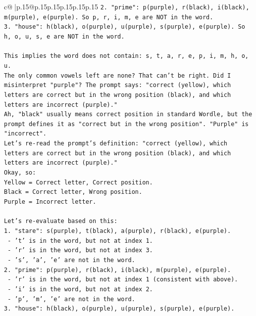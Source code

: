 \documentclass{article}
\begin{document}
{\begin{supertabular}{c@{$\;$}|p{.15\linewidth}@{}p{.15\linewidth}p{.15\linewidth}p{.15\linewidth}p{.15\linewidth}p{.15\linewidth}}
{{{\texttt{2. "prime": p(purple), r(black), i(black), m(purple), e(purple). So p, r, i, m, e are NOT in the word.} \\
\texttt{3. "house": h(black), o(purple), u(purple), s(purple), e(purple). So h, o, u, s, e are NOT in the word.} \\
\\ 
\texttt{This implies the word does not contain: s, t, a, r, e, p, i, m, h, o, u.} \\
\texttt{The only common vowels left are none? That can't be right. Did I misinterpret "purple"? The prompt says: "correct (yellow), which letters are correct but in the wrong position (black), and which letters are incorrect (purple)."} \\
\texttt{Ah, "black" usually means correct position in standard Wordle, but the prompt defines it as "correct but in the wrong position". "Purple" is "incorrect".} \\
\texttt{Let's re{-}read the prompt's definition: "correct (yellow), which letters are correct but in the wrong position (black), and which letters are incorrect (purple)."} \\
\texttt{Okay, so:} \\
\texttt{Yellow = Correct letter, Correct position.} \\
\texttt{Black = Correct letter, Wrong position.} \\
\texttt{Purple = Incorrect letter.} \\
\\ 
\texttt{Let's re{-}evaluate based on this:} \\
\texttt{1. "stare": s(purple), t(black), a(purple), r(black), e(purple).} \\
\texttt{   {-} 't' is in the word, but not at index 1.} \\
\texttt{   {-} 'r' is in the word, but not at index 3.} \\
\texttt{   {-} 's', 'a', 'e' are not in the word.} \\
\texttt{2. "prime": p(purple), r(black), i(black), m(purple), e(purple).} \\
\texttt{   {-} 'r' is in the word, but not at index 1 (consistent with above).} \\
\texttt{   {-} 'i' is in the word, but not at index 2.} \\
\texttt{   {-} 'p', 'm', 'e' are not in the word.} \\
\texttt{3. "house": h(black), o(purple), u(purple), s(purple), e(purple).} \\
}}}
\end{supertabular}}
\end{document}
